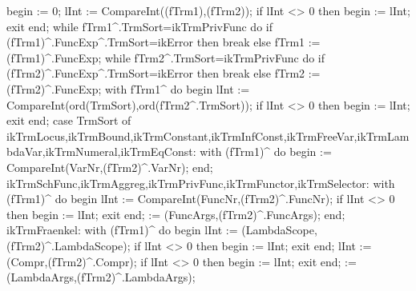 begin
    := 0;
   lInt := CompareInt((fTrm1),(fTrm2));
   if lInt <> 0 then begin  := lInt; exit end;
   while fTrm1^.TrmSort=ikTrmPrivFunc do
      if (fTrm1)^.FuncExp^.TrmSort=ikError then break
      else fTrm1 := (fTrm1)^.FuncExp;
   while fTrm2^.TrmSort=ikTrmPrivFunc do
      if (fTrm2)^.FuncExp^.TrmSort=ikError then break
      else fTrm2 := (fTrm2)^.FuncExp;
   with fTrm1^ do
   begin
      lInt := CompareInt(ord(TrmSort),ord(fTrm2^.TrmSort));
      if lInt <> 0 then begin  := lInt; exit end;
      case TrmSort of
         ikTrmLocus,ikTrmBound,ikTrmConstant,ikTrmInfConst,ikTrmFreeVar,ikTrmLambdaVar,ikTrmNumeral,ikTrmEqConst:
            with (fTrm1)^ do
         begin
             := CompareInt(VarNr,(fTrm2)^.VarNr);
         end;
         ikTrmSchFunc,ikTrmAggreg,ikTrmPrivFunc,ikTrmFunctor,ikTrmSelector:
            with (fTrm1)^ do
         begin
            lInt := CompareInt(FuncNr,(fTrm2)^.FuncNr);
            if lInt <> 0 then begin  := lInt; exit end;
             := (FuncArgs,(fTrm2)^.FuncArgs);
         end;
         ikTrmFraenkel:
            with (fTrm1)^  do
         begin
            lInt := (LambdaScope,(fTrm2)^.LambdaScope);
            if lInt <> 0 then begin  := lInt; exit end;
            lInt := (Compr,(fTrm2)^.Compr);
            if lInt <> 0 then begin  := lInt; exit end;
             := (LambdaArgs,(fTrm2)^.LambdaArgs);
